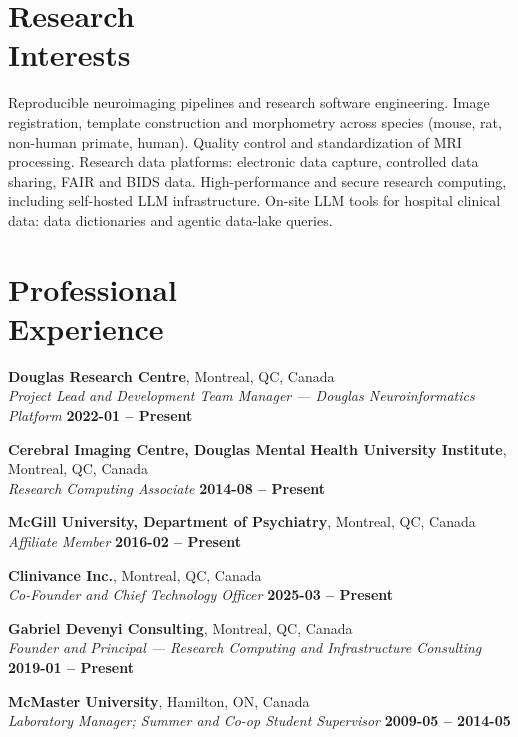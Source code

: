 \documentclass[margin1,line,canadian]{resume}
\begin{document}
\begin{resume}
 \section{\mysidestyle{}Research\\Interests}
 Reproducible neuroimaging pipelines and research software engineering. Image registration, template
 construction and morphometry across species (mouse, rat, non-human primate, human). Quality control and
 standardization of MRI processing. Research data platforms: electronic data capture, controlled data sharing,
 FAIR and BIDS data. High-performance and secure research computing, including self-hosted LLM infrastructure.
 On-site LLM tools for hospital clinical data: data dictionaries and agentic data-lake queries.

 \section{\mysidestyle{}Professional\\Experience}
 \textbf{Douglas Research Centre}, Montreal, QC, Canada\\%
 \textsl{Project Lead and Development Team Manager --- Douglas Neuroinformatics Platform} \hfill \textbf{2022-01 -- Present}

 \textbf{Cerebral Imaging Centre, Douglas Mental Health University Institute}, Montreal, QC, Canada\\%
 \textsl{Research Computing Associate} \hfill \textbf{2014-08 -- Present}

 \textbf{McGill University, Department of Psychiatry}, Montreal, QC, Canada\\%
 \textsl{Affiliate Member} \hfill \textbf{2016-02 -- Present}

 \textbf{Clinivance Inc.}, Montreal, QC, Canada\\%
 \textsl{Co-Founder and Chief Technology Officer} \hfill \textbf{2025-03 -- Present}

 \textbf{Gabriel Devenyi Consulting}, Montreal, QC, Canada\\%
 \textsl{Founder and Principal --- Research Computing and Infrastructure Consulting} \hfill \textbf{2019-01 -- Present}

 \textbf{McMaster University}, Hamilton, ON, Canada\\%
 \textsl{Laboratory Manager; Summer and Co-op Student Supervisor} \hfill \textbf{2009-05 -- 2014-05}


\end{resume}
\end{document}

